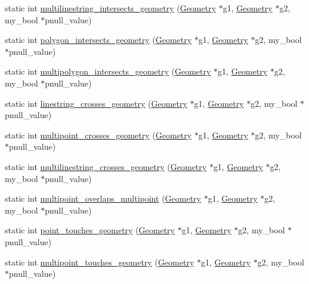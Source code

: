 \begin{DoxyCompactItemize}
\item 
static int \mbox{\hyperlink{classBG__wrap_a58e14115bdda7b4568dcde7cfa8b32b0}{multilinestring\+\_\+intersects\+\_\+geometry}} (\mbox{\hyperlink{classGeometry}{Geometry}} $\ast$g1, \mbox{\hyperlink{classGeometry}{Geometry}} $\ast$g2, my\+\_\+bool $\ast$pnull\+\_\+value)
\item 
static int \mbox{\hyperlink{classBG__wrap_ad56f493cbaec187951e63598b3e00eb1}{polygon\+\_\+intersects\+\_\+geometry}} (\mbox{\hyperlink{classGeometry}{Geometry}} $\ast$g1, \mbox{\hyperlink{classGeometry}{Geometry}} $\ast$g2, my\+\_\+bool $\ast$pnull\+\_\+value)
\item 
static int \mbox{\hyperlink{classBG__wrap_a6ba400043bd909b06ea9a8328a21c386}{multipolygon\+\_\+intersects\+\_\+geometry}} (\mbox{\hyperlink{classGeometry}{Geometry}} $\ast$g1, \mbox{\hyperlink{classGeometry}{Geometry}} $\ast$g2, my\+\_\+bool $\ast$pnull\+\_\+value)
\item 
static int \mbox{\hyperlink{classBG__wrap_acc1d1579c412ef461472291065389797}{linestring\+\_\+crosses\+\_\+geometry}} (\mbox{\hyperlink{classGeometry}{Geometry}} $\ast$g1, \mbox{\hyperlink{classGeometry}{Geometry}} $\ast$g2, my\+\_\+bool $\ast$pnull\+\_\+value)
\item 
static int \mbox{\hyperlink{classBG__wrap_a51344d58a308c5e21e7690b601e0b0f9}{multipoint\+\_\+crosses\+\_\+geometry}} (\mbox{\hyperlink{classGeometry}{Geometry}} $\ast$g1, \mbox{\hyperlink{classGeometry}{Geometry}} $\ast$g2, my\+\_\+bool $\ast$pnull\+\_\+value)
\item 
static int \mbox{\hyperlink{classBG__wrap_a68bd3e86360d78cffcff0892d9e0fce6}{multilinestring\+\_\+crosses\+\_\+geometry}} (\mbox{\hyperlink{classGeometry}{Geometry}} $\ast$g1, \mbox{\hyperlink{classGeometry}{Geometry}} $\ast$g2, my\+\_\+bool $\ast$pnull\+\_\+value)
\item 
static int \mbox{\hyperlink{classBG__wrap_a6b8a94efbe0fc1fcd3d5c9236f5ada8a}{multipoint\+\_\+overlaps\+\_\+multipoint}} (\mbox{\hyperlink{classGeometry}{Geometry}} $\ast$g1, \mbox{\hyperlink{classGeometry}{Geometry}} $\ast$g2, my\+\_\+bool $\ast$pnull\+\_\+value)
\item 
static int \mbox{\hyperlink{classBG__wrap_a5a3c7ff46202d545970bed6ddc72219a}{point\+\_\+touches\+\_\+geometry}} (\mbox{\hyperlink{classGeometry}{Geometry}} $\ast$g1, \mbox{\hyperlink{classGeometry}{Geometry}} $\ast$g2, my\+\_\+bool $\ast$pnull\+\_\+value)
\item 
static int \mbox{\hyperlink{classBG__wrap_a6e9e36fe7c7ce00a6b46ba243822b5c0}{multipoint\+\_\+touches\+\_\+geometry}} (\mbox{\hyperlink{classGeometry}{Geometry}} $\ast$g1, \mbox{\hyperlink{classGeometry}{Geometry}} $\ast$g2, my\+\_\+bool $\ast$pnull\+\_\+value)

\end{DoxyCompactItemize}
